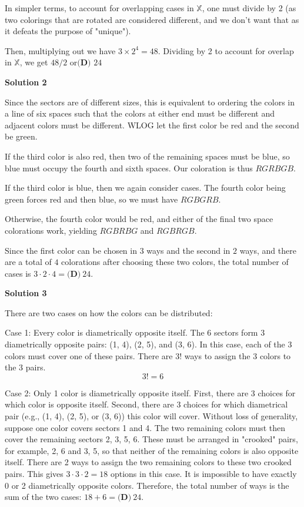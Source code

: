 \begin{enumerate}
 In simpler terms, to account for overlapping cases in \( \mathbb{X} \), one must divide by 2 (as two colorings that are rotated are considered different, and we don't want that as it defeats the purpose of "unique").

 Then, multiplying out we have \( 3 \times 2^4 = 48 \). Dividing by 2 to account for overlap in \( \mathbb{X} \), we get \( 48/2 \) or$\boxed{\textbf{(D) } 24}$




\textbf{Solution 2}

Since the sectors are of different sizes, this is equivalent to ordering the colors in a line of six spaces such that the colors at either end must be different and adjacent colors must be different. WLOG let the first color be red and the second be green.

 If the third color is also red, then two of the remaining spaces must be blue, so blue must occupy the fourth and sixth spaces. Our coloration is thus $RGRBGB$.

 If the third color is blue, then we again consider cases. The fourth color being green forces red and then blue, so we must have $RGBGRB$.

 Otherwise, the fourth color would be red, and either of the final two space colorations work, yielding $RGBRBG$ and $RGBRGB$.

 Since the first color can be chosen in $3$ ways and the second in $2$ ways, and there are a total of $4$ colorations after choosing these two colors, the total number of cases is $3\cdot2\cdot4=\boxed{\textbf{(D)}~24}$.

 



\textbf{Solution 3}

There are two cases on how the colors can be distributed: 

 Case 1: Every color is diametrically opposite itself. The 6 sectors form 3 diametrically opposite pairs: (1, 4), (2, 5), and (3, 6). In this case, each of the 3 colors must cover one of these pairs. There are $3!$ ways to assign the 3 colors to the 3 pairs. 
 \[3! = 6\]

 Case 2: Only 1 color is diametrically opposite itself. First, there are 3 choices for which color is opposite itself. Second, there are 3 choices for which diametrical pair (e.g., (1, 4), (2, 5), or (3, 6)) this color will cover. Without loss of generality, suppose one color covers sectors 1 and 4. The two remaining colors must then cover the remaining sectors {2, 3, 5, 6}. These must be arranged in "crooked" pairs, for example, {2, 6} and {3, 5}, so that neither of the remaining colors is also opposite itself. There are 2 ways to assign the two remaining colors to these two crooked pairs. This gives $3 \cdot 3 \cdot 2 = 18$ options in this case. It is impossible to have exactly 0 or 2 diametrically opposite colors. Therefore, the total number of ways is the sum of the two cases: $18 + 6 =\boxed{\textbf{(D)}~24}$.


\end{enumerate}

